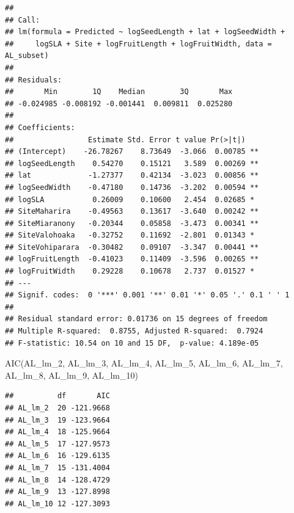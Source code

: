 \documentclass[
  12pt,
]{article}
\newenvironment{Shaded}{\begin{snugshade}}{\end{snugshade}}
\newcommand{\FunctionTok}[1]{\textcolor[rgb]{0.00,0.00,0.00}{#1}}
\newcommand{\NormalTok}[1]{#1}
\begin{document}
\begin{verbatim}
## 
## Call:
## lm(formula = Predicted ~ logSeedLength + lat + logSeedWidth + 
##     logSLA + Site + logFruitLength + logFruitWidth, data = AL_subset)
## 
## Residuals:
##       Min        1Q    Median        3Q       Max 
## -0.024985 -0.008192 -0.001441  0.009811  0.025280 
## 
## Coefficients:
##                 Estimate Std. Error t value Pr(>|t|)   
## (Intercept)    -26.78267    8.73649  -3.066  0.00785 **
## logSeedLength    0.54270    0.15121   3.589  0.00269 **
## lat             -1.27377    0.42134  -3.023  0.00856 **
## logSeedWidth    -0.47180    0.14736  -3.202  0.00594 **
## logSLA           0.26009    0.10600   2.454  0.02685 * 
## SiteMaharira    -0.49563    0.13617  -3.640  0.00242 **
## SiteMiaranony   -0.20344    0.05858  -3.473  0.00341 **
## SiteValohoaka   -0.32752    0.11692  -2.801  0.01343 * 
## SiteVohiparara  -0.30482    0.09107  -3.347  0.00441 **
## logFruitLength  -0.41023    0.11409  -3.596  0.00265 **
## logFruitWidth    0.29228    0.10678   2.737  0.01527 * 
## ---
## Signif. codes:  0 '***' 0.001 '**' 0.01 '*' 0.05 '.' 0.1 ' ' 1
## 
## Residual standard error: 0.01736 on 15 degrees of freedom
## Multiple R-squared:  0.8755, Adjusted R-squared:  0.7924 
## F-statistic: 10.54 on 10 and 15 DF,  p-value: 4.189e-05
\end{verbatim}

\begin{Shaded}
\begin{Highlighting}[]
\FunctionTok{AIC}\NormalTok{(AL\_lm\_2, AL\_lm\_3, AL\_lm\_4, AL\_lm\_5, AL\_lm\_6, AL\_lm\_7, AL\_lm\_8, AL\_lm\_9, AL\_lm\_10)}
\end{Highlighting}
\end{Shaded}

\begin{verbatim}
##          df       AIC
## AL_lm_2  20 -121.9668
## AL_lm_3  19 -123.9664
## AL_lm_4  18 -125.9664
## AL_lm_5  17 -127.9573
## AL_lm_6  16 -129.6135
## AL_lm_7  15 -131.4004
## AL_lm_8  14 -128.4729
## AL_lm_9  13 -127.8998
## AL_lm_10 12 -127.3093
\end{verbatim}
\end{document}
